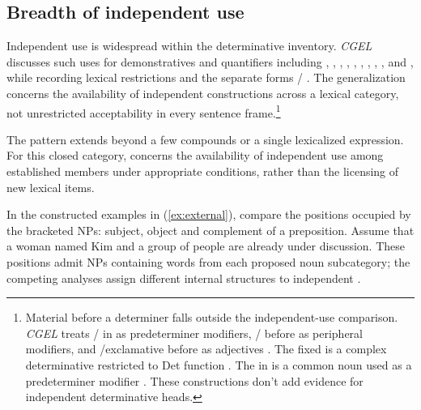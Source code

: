 \documentclass[12pt]{article}
\begin{document}
\subsection{Breadth of independent use}\label{sec:independent}

Independent use is widespread within the determinative inventory. \textit{CGEL} discusses such uses for demonstratives and quantifiers including , , , , , , , , ,  and , while recording lexical restrictions and the separate forms / \citep[371--372, 410--424]{huddleston2002}. The generalization concerns the availability of independent constructions across a lexical category, not unrestricted acceptability in every sentence frame.\footnote{Material before a determiner falls outside the independent-use comparison. \textit{CGEL} treats / in  as predeterminer modifiers, / before  as peripheral modifiers, and /exclamative  before  as adjectives \citep[433--437]{huddleston2002}. The fixed  is a complex determinative restricted to Det function \citep[394]{huddleston2002}. The  in  is a common noun used as a predeterminer modifier \citep[434]{huddleston2002}. These constructions don't add evidence for independent determinative heads.}

The pattern extends beyond a few compounds or a single lexicalized expression. For this closed category,  concerns the availability of independent use among established members under appropriate conditions, rather than the licensing of new lexical items.

In the constructed examples in (\ref{ex:external}), compare the positions occupied by the bracketed NPs: subject, object and complement of a preposition. Assume that a woman named Kim and a group of people are already under discussion. These positions admit NPs containing words from each proposed noun subcategory; the competing analyses assign different internal structures to independent .

\begin{samepage}
\ea\label{ex:external}
\ea {}\qquad {}\qquad {}
\ex {}\qquad {}\qquad {}
\ex {}\qquad {}\qquad {}
\ex {}\qquad {}\qquad {}
\z\z
\end{samepage}
\end{document}
